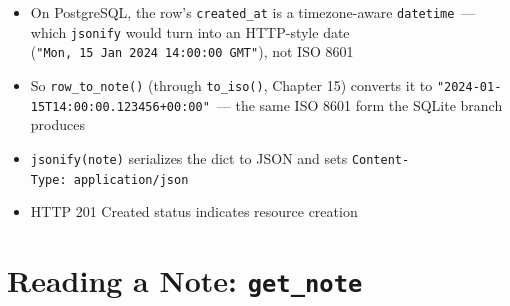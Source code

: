 \begin{itemize}
\tightlist
\item
  On PostgreSQL, the row's \texttt{created\_at} is a timezone-aware \texttt{datetime}~--- which \texttt{jsonify} would turn into an HTTP-style date (\texttt{"Mon,}\allowbreak{}\texttt{\ 15\ Jan\ 2024\ 14:}\allowbreak{}\texttt{00:}\allowbreak{}\texttt{00\ GMT"}), not ISO 8601
\item
  So \texttt{row\_to\_note()} (through \texttt{to\_iso()}, Chapter 15) converts it to \texttt{"2024-}\allowbreak{}\texttt{01-}\allowbreak{}\texttt{15T14:}\allowbreak{}\texttt{00:}\allowbreak{}\texttt{00.}\allowbreak{}\texttt{123456+00:}\allowbreak{}\texttt{00"}~--- the same ISO 8601 form the SQLite branch produces
\item
  \texttt{jsonify(note)} serializes the dict to JSON and sets \texttt{Content-}\allowbreak{}\texttt{Type:}\allowbreak{}\texttt{\ application/}\allowbreak{}\texttt{json}
\item
  HTTP 201 Created status indicates resource creation
\end{itemize}

\setcounter{section}{6}
\section{\texorpdfstring{Reading a Note: \texttt{get\_note}}{Reading a Note: get\_note}}\label{33-logic-execution:337-reading-a-note-get-note}

